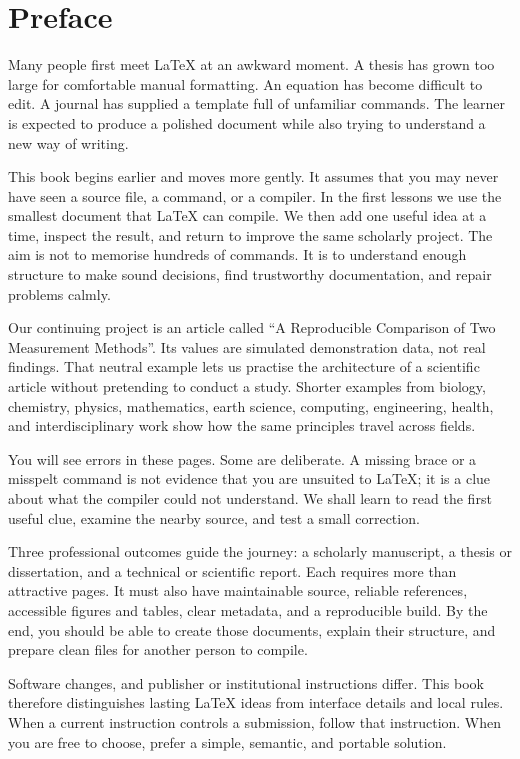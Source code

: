 \chapter*{Preface}

Many people first meet \LaTeX{} at an awkward moment. A thesis has grown too
large for comfortable manual formatting. An equation has become difficult to
edit. A journal has supplied a template full of unfamiliar commands. The
learner is expected to produce a polished document while also trying to
understand a new way of writing.

This book begins earlier and moves more gently. It assumes that you may never
have seen a source file, a command, or a compiler. In the first lessons we use
the smallest document that \LaTeX{} can compile. We then add one useful idea at a
time, inspect the result, and return to improve the same scholarly project.
The aim is not to memorise hundreds of commands. It is to understand enough
structure to make sound decisions, find trustworthy documentation, and repair
problems calmly.

Our continuing project is an article called ``A Reproducible Comparison of
Two Measurement Methods''. Its values are simulated demonstration data, not
real findings. That neutral example lets us practise the architecture of a
scientific article without pretending to conduct a study. Shorter examples
from biology, chemistry, physics, mathematics, earth science, computing,
engineering, health, and interdisciplinary work show how the same principles
travel across fields.

You will see errors in these pages. Some are deliberate. A missing brace or a
misspelt command is not evidence that you are unsuited to \LaTeX{}; it is a clue
about what the compiler could not understand. We shall learn to read the first
useful clue, examine the nearby source, and test a small correction.

Three professional outcomes guide the journey: a scholarly manuscript, a
thesis or dissertation, and a technical or scientific report. Each requires
more than attractive pages. It must also have maintainable source, reliable
references, accessible figures and tables, clear metadata, and a reproducible
build. By the end, you should be able to create those documents, explain their
structure, and prepare clean files for another person to compile.

Software changes, and publisher or institutional instructions differ. This
book therefore distinguishes lasting \LaTeX{} ideas from interface details and
local rules. When a current instruction controls a submission, follow that
instruction. When you are free to choose, prefer a simple, semantic, and
portable solution.

